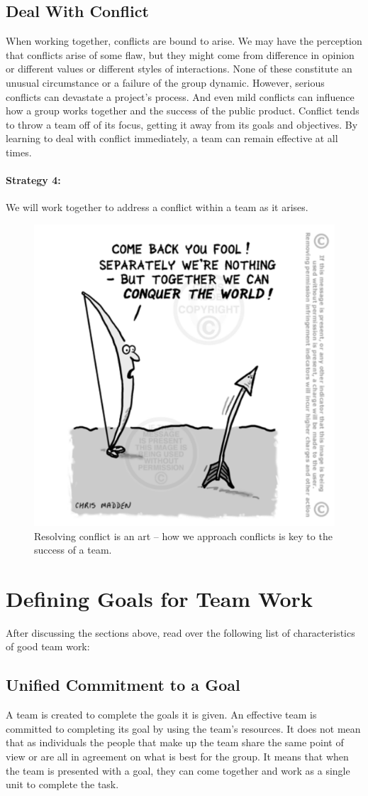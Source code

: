 \documentclass{article}\usepackage[]{graphicx}\usepackage[]{color}
\begin{document}
\subsection{Deal With Conflict}

When working together, conflicts are bound to arise. We may have the perception that conflicts arise of some flaw, but they might come from difference in opinion or different values or different styles of interactions. None of these constitute an unusual circumstance or a failure of the group dynamic. However, serious conflicts can devastate a project's process. And even mild conflicts can influence how a group works together and the success of the public product. Conflict tends to throw a team off of its focus, getting it away from its goals and objectives. By learning to deal with conflict immediately, a team can remain effective at all times.

\paragraph{Strategy 4:} We will work together to address a conflict within a team as it arises. 

\begin{figure}
\includegraphics[width=.50\textwidth]{../graphics/Bow-arrow-conquer-world}
\caption{Resolving conflict is an art -- how we approach conflicts is key to the success of a team.}
\end{figure}

\section{Defining Goals for Team Work} 

After discussing the sections above, read over the following list of characteristics of good team work: 

\subsection{Unified Commitment to a Goal}
A team is created to complete the goals it is given. An effective team is committed to completing its goal by using the team's resources. It does not mean that as individuals the people that make up the team share the same point of view or are all in agreement on what is best for the group. It means that when the team is presented with a goal, they can come together and work as a single unit to complete the task.
\end{document}
